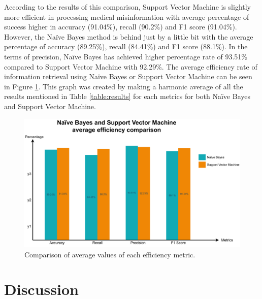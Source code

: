 \documentclass[11pt ,english,a4paper]{article}
\begin{document}
According to the results of this comparison, Support Vector Machine is slightly more efficient in processing medical misinformation with average percentage of success higher in accuracy (91.04\%), recall (90.2\%) and F1 score (91.04\%). However, the Naïve Bayes method is behind just by a little bit with the average percentage of accuracy (89.25\%), recall (84.41\%) and F1 score (88.1\%). In the terms of precision, Naïve Bayes has achieved higher percentage rate of 93.51\% compared to Support Vector Machine with 92.29\%. The average efficiency rate of information retrieval using Naïve Bayes or Support Vector Machine can be seen in Figure \ref{f:average}. This graph was created by making a harmonic average of all the results mentioned in Table \ref{table:results} for each metrics for both Naïve Bayes and Support Vector Machine.

\begin{figure}[H]
\centering
\includegraphics[scale=0.5]{average.pdf}
\caption{\centering Comparison of average values of each efficiency metric.}
\label{f:average}
\end{figure}

\section{Discussion}
\end{document}
